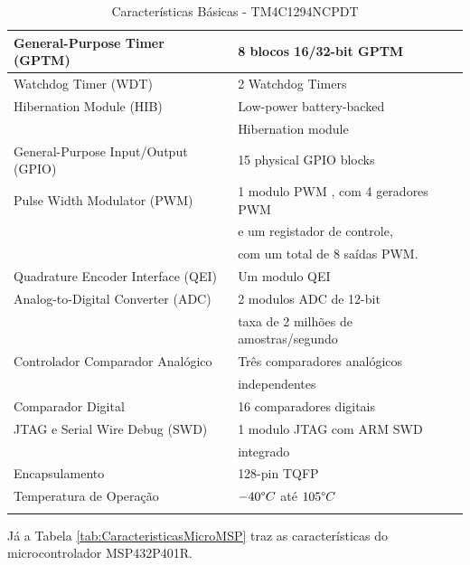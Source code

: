 \begin{longtable}{|l|l|}
	\hline
	General-Purpose Timer (GPTM) & 8 blocos 16/32-bit GPTM \\
	\hline
	Watchdog Timer (WDT) & 2 Watchdog Timers \\
	\hline
	Hibernation Module (HIB) & Low-power battery-backed \\
	 & Hibernation module \\
	\hline
	General-Purpose Input/Output (GPIO) & 15 physical GPIO blocks \\
	\hline
	Pulse Width Modulator (PWM) & 1 modulo PWM , com 4 geradores PWM  \\
	 & e um  registador de controle,\\
	 &  com um total de 8  saídas PWM.\\
	\hline
	Quadrature Encoder Interface (QEI) & Um modulo QEI \\
	\hline
	Analog-to-Digital Converter (ADC) & 2 modulos ADC de 12-bit\\
	 & taxa de 2 milhões de amostras/segundo\\
	\hline
	Controlador Comparador Analógico & Três comparadores analógicos \\
	& independentes \\
	\hline
	Comparador Digital & 16 comparadores digitais \\
	\hline
	JTAG e Serial Wire Debug (SWD) & 1 modulo JTAG  com ARM SWD\\
	& integrado \\
	\hline
	Encapsulamento & 128-pin TQFP \\
	\hline
	Temperatura de Operação & $-40 \degree C$ até $105 \degree C$ \\
	\hline
	\caption{Características Básicas - TM4C1294NCPDT \cite{DATASHEET_Tiva}}
	\label{tab:CaracteristicasMicroTiva}
\end{longtable}

Já a Tabela \ref{tab:CaracteristicasMicroMSP} traz as características do microcontrolador MSP432P401R\texttrademark.




